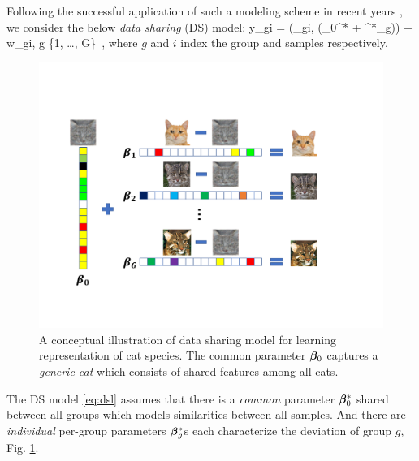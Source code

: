 Following the successful application of such a modeling scheme in recent years \cite{domu16, grti16,  olvi14, olvi15}, we consider the below \emph{data sharing} (DS) model: 
\beq
\label{eq:dsl}
y_{gi} = \phi(\x_{gi}, (\bbeta_0^* + \bbeta^*_g)) + w_{gi}, \quad g \in \{1, \dots, G\}~,
\eeq
where $g$ and $i$ index the group and samples respectively. 
\begin{figure}[!b]
	\centering
	\includegraphics[scale=.3]{./img/concept.pdf}
	\caption{\small A conceptual illustration of data sharing model for learning representation of  cat species. The common parameter $\boldsymbol{\beta}_0$ captures a \emph{generic cat} which consists of shared features among all cats.}
	\label{fig:cat}		
\end{figure}
The DS model \eqref{eq:dsl} assumes that there is a \emph{common} parameter $\boldsymbol{\beta}^*_0$ shared between all groups which models similarities between all samples. And there are \emph{individual} per-group parameters $\boldsymbol{\beta}_g^*$s each characterize the deviation of group $g$, Fig. \ref{fig:cat}.%

